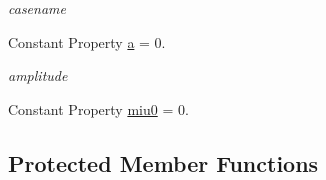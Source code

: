 \begin{DoxyCompactItemize}
\begin{DoxyCompactList}\small\item\em casename \end{DoxyCompactList}\item 
Constant Property \hyperlink{class_open_channel3d_a2102b0fd16e119165e1699810912bc3e}{a} = 0.
\begin{DoxyCompactList}\small\item\em amplitude \end{DoxyCompactList}\item 
Constant Property \hyperlink{class_open_channel3d_a29718d5d95f0ead35d689690a361c1e2}{miu0} = 0.
\end{DoxyCompactItemize}
\subsection*{Protected Member Functions}
